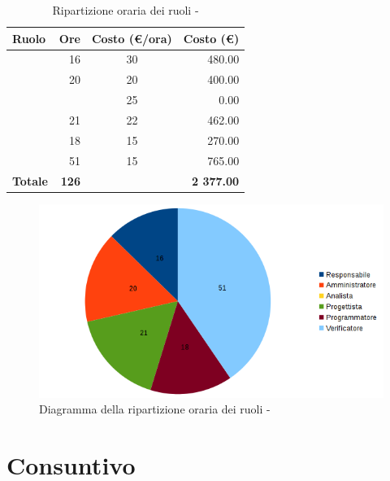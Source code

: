 \documentclass[12pt,a4paper]{article}
\begin{document}
\begin{table}[H]
	\begin{center}
		\begin{tabular}{l r c r}
			\toprule
			\textbf{Ruolo}	& \textbf{Ore} & \textbf{Costo (\euro/ora)}	& \textbf{Costo (\euro)} \\
			\midrule
			\midrule
			\RE & 16 & 30 & 480.00\\
			\midrule
			\AM & 20 & 20 & 400.00\\ 
			\midrule
			\AN & & 25 & 0.00\\ 
			\midrule
			\PG & 21 & 22 & 462.00\\ 
			\midrule
			\PR & 18 & 15 & 270.00\\ 
			\midrule
			\VR & 51 & 15 & 765.00\\ 
			\midrule
			\textbf{Totale} & \textbf{126} &  & \textbf{2 377.00}\\
			\bottomrule
		\end{tabular}
		\caption{Ripartizione oraria dei ruoli - \FVV}
	\end{center}
\end{table}

\begin{center}
	\begin{figure}[H]
		\centering
		\includegraphics[width=\textwidth]{diagrammaTortaVerificaValidazioneTotaleOre.png}
		\caption{Diagramma della ripartizione oraria dei ruoli - \FVV}
	\end{figure}
\end{center}

\newpage

\section{Consuntivo}
\end{document}
